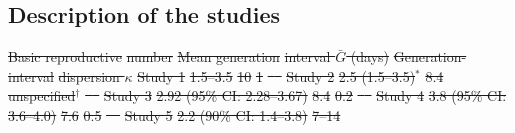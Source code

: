 \documentclass[12pt]{article}
\newcommand{\Ro}{\ensuremath{{\mathcal R}_{0}}\xspace}
\providecommand{\DIFdeltex}[1]{{\protect\color{red}\sout{#1}}}                      %
\providecommand{\DIFdelbegin}{} %
\providecommand{\DIFdelFL}[1]{\DIFdel{#1}} %
\providecommand{\DIFdel}[1]{\texorpdfstring{\DIFdeltex{#1}}{}} %
\newcommand{\DIFscaledelfig}{0.5}
\newlength{\DIFdelgraphicswidth} %
\newlength{\DIFdelgraphicsheight} %
\newcommand{\DIFdelincludegraphics}[2][]{%
\sbox{\DIFdelgraphicsbox}{\DIFOincludegraphics[#1]{#2}}%
\settoboxwidth{\DIFdelgraphicswidth}{\DIFdelgraphicsbox} %
\settoboxtotalheight{\DIFdelgraphicsheight}{\DIFdelgraphicsbox} %
\scalebox{\DIFscaledelfig}{%
\parbox[b]{\DIFdelgraphicswidth}{\usebox{\DIFdelgraphicsbox}\\[-\baselineskip] \rule{\DIFdelgraphicswidth}{0em}}\llap{\resizebox{\DIFdelgraphicswidth}{\DIFdelgraphicsheight}{%
\setlength{\unitlength}{\DIFdelgraphicswidth}%
\begin{picture}(1,1)%
\thicklines\linethickness{2pt} %
{\color[rgb]{1,0,0}\put(0,0){\framebox(1,1){}}}%
{\color[rgb]{1,0,0}\put(0,0){\line( 1,1){1}}}%
{\color[rgb]{1,0,0}\put(0,1){\line(1,-1){1}}}%
\end{picture}%
}\hspace*{3pt}}} %
} %
\DeclareRobustCommand{\DIFdelbegin}{\DIFOdelbegin \let\includegraphics\DIFdelincludegraphics} %
\begin{document}
\subsection{Description of the studies}

\DIFdelbegin %
\DIFdelFL{Basic reproductive}%
\DIFdelFL{number }%
\DIFdelFL{Mean generation}%
\DIFdelFL{interval $\bar G$ (days) }%
\DIFdelFL{Generation-interval}%
\DIFdelFL{dispersion $\kappa$ }%
\DIFdelFL{Study 1 }%
\DIFdelFL{1.5--3.5 }%
\DIFdelFL{10 }%
\DIFdelFL{1 }%
\DIFdelFL{\mbox{%
\cite{bedfordncov} }\hspace{0pt}%
}%
\DIFdelFL{Study 2 }%
\DIFdelFL{2.5 (1.5--3.5)$^\ast$ }%
\DIFdelFL{8.4 }%
\DIFdelFL{unspecified$^\dagger$ }%
\DIFdelFL{\mbox{%
\cite{imaincov} }\hspace{0pt}%
}%
\DIFdelFL{Study 3 }%
\DIFdelFL{2.92 (95\% CI: 2.28--3.67) }%
\DIFdelFL{8.4 }%
\DIFdelFL{0.2 }%
\DIFdelFL{\mbox{%
\cite{liuncov} }\hspace{0pt}%
}%
\DIFdelFL{Study 4 }%
\DIFdelFL{3.8 (95\% CI: 3.6--4.0) }%
\DIFdelFL{7.6 }%
\DIFdelFL{0.5 }%
\DIFdelFL{\mbox{%
\cite{readncov} }\hspace{0pt}%
}%
\DIFdelFL{Study 5 }%
\DIFdelFL{2.2 (90\% CI: 1.4--3.8) }%
\DIFdelFL{7--14 }%
\end{document}
